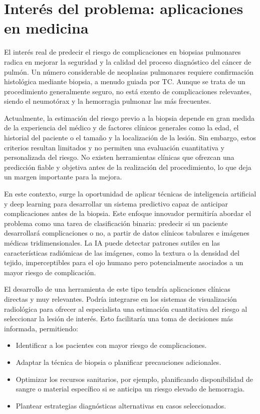 \section{Interés del problema: aplicaciones en medicina}

El interés real de predecir el riesgo de complicaciones en biopsias pulmonares radica en mejorar la seguridad y la calidad del proceso diagnóstico del cáncer de pulmón. Un número considerable de neoplasias pulmonares requiere confirmación histológica mediante biopsia, a menudo guiada por TC. Aunque se trata de un procedimiento generalmente seguro, no está exento de complicaciones relevantes, siendo el neumotórax y la hemorragia pulmonar las más frecuentes.

Actualmente, la estimación del riesgo previo a la biopsia depende en gran medida de la experiencia del médico y de factores clínicos generales como la edad, el historial del paciente o el tamaño y la localización de la lesión. Sin embargo, estos criterios resultan limitados y no permiten una evaluación cuantitativa y personalizada del riesgo. No existen herramientas clínicas que ofrezcan una predicción fiable y objetiva antes de la realización del procedimiento, lo que deja un margen importante para la mejora.

En este contexto, surge la oportunidad de aplicar técnicas de inteligencia artificial y deep learning para desarrollar un sistema predictivo capaz de anticipar complicaciones antes de la biopsia. Este enfoque innovador permitiría abordar el problema como una tarea de clasificación binaria: predecir si un paciente desarrollará complicaciones o no, a partir de datos clínicos tabulares e imágenes médicas tridimensionales. La IA puede detectar patrones sutiles en las características radiómicas de las imágenes, como la textura o la densidad del tejido, imperceptibles para el ojo humano pero potencialmente asociados a un mayor riesgo de complicación.

El desarrollo de una herramienta de este tipo tendría aplicaciones clínicas directas y muy relevantes. Podría integrarse en los sistemas de visualización radiológica para ofrecer al especialista una estimación cuantitativa del riesgo al seleccionar la lesión de interés. Esto facilitaría una toma de decisiones más informada, permitiendo:

\begin{itemize}
    \item Identificar a los pacientes con mayor riesgo de complicaciones.
    \item Adaptar la técnica de biopsia o planificar precauciones adicionales.
    \item Optimizar los recursos sanitarios, por ejemplo, planificando disponibilidad de sangre o material específico si se anticipa un riesgo elevado de hemorragia.
    \item Plantear estrategias diagnósticas alternativas en casos seleccionados.
\end{itemize}

